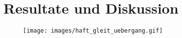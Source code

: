 \section{Resultate und Diskussion}

\begin{figure}
    \centering
    \texttt{[image: images/haft\_gleit\_uebergang.gif]}
    \caption{}
\end{figure}

